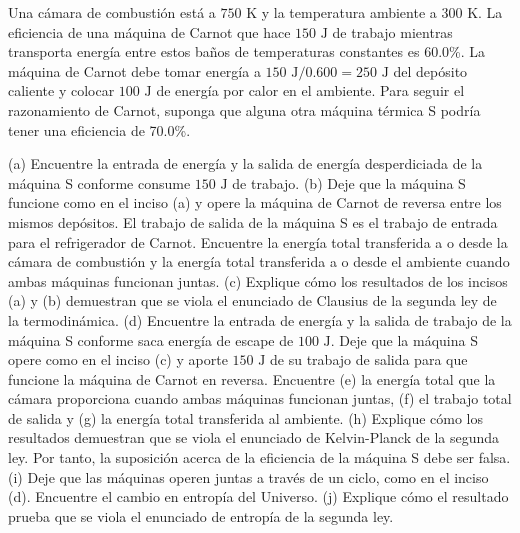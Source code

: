 \item Una cámara de combustión está a $750\text{ K}$ y la temperatura ambiente a $300\text{ K}$. La eficiencia de una máquina de Carnot que hace $150\text{ J}$ de trabajo mientras transporta energía entre estos baños de temperaturas constantes es 60.0\%. La máquina de Carnot debe tomar energía a $150\text{ J}/0.600 = 250\text{ J}$ del depósito caliente y colocar $100\text{ J}$ de energía por calor en el ambiente. Para seguir el razonamiento de Carnot, suponga que alguna otra máquina térmica S podría tener una eficiencia de 70.0\%. 

(a) Encuentre la entrada de energía y la salida de energía desperdiciada de la máquina S conforme consume $150\text{ J}$ de trabajo. 
(b) Deje que la máquina S funcione como en el inciso (a) y opere la máquina de Carnot de reversa entre los mismos depósitos. El trabajo de salida de la máquina S es el trabajo de entrada para el refrigerador de Carnot. Encuentre la energía total transferida a o desde la cámara de combustión y la energía total transferida a o desde el ambiente cuando ambas máquinas funcionan juntas. 
(c) Explique cómo los resultados de los incisos (a) y (b) demuestran que se viola el enunciado de Clausius de la segunda ley de la termodinámica. 
(d) Encuentre la entrada de energía y la salida de trabajo de la máquina S conforme saca energía de escape de $100\text{ J}$. Deje que la máquina S opere como en el inciso (c) y aporte $150\text{ J}$ de su trabajo de salida para que funcione la máquina de Carnot en reversa. Encuentre 
(e) la energía total que la cámara proporciona cuando ambas máquinas funcionan juntas, 
(f) el trabajo total de salida y 
(g) la energía total transferida al ambiente. 
(h) Explique cómo los resultados demuestran que se viola el enunciado de Kelvin-Planck de la segunda ley. Por tanto, la suposición acerca de la eficiencia de la máquina S debe ser falsa. 
(i) Deje que las máquinas operen juntas a través de un ciclo, como en el inciso (d). Encuentre el cambio en entropía del Universo. 
(j) Explique cómo el resultado prueba que se viola el enunciado de entropía de la segunda ley.
